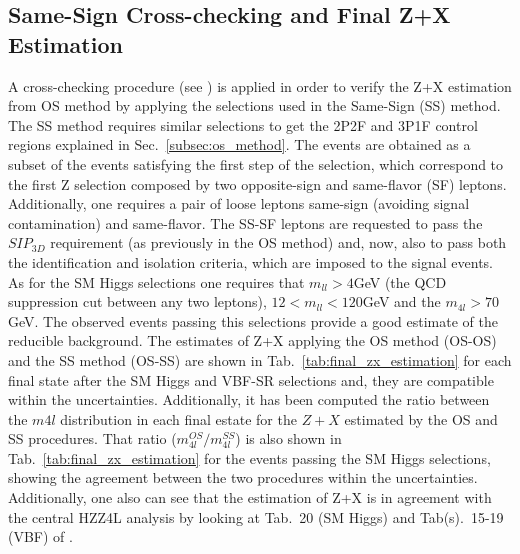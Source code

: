 \subsection{Same-Sign Cross-checking and Final Z+X Estimation}
A cross-checking procedure (see \cite{bib:CMS-HIG-13-002,bib:CMS-AN-16-328}) is applied in order to verify the Z+X estimation from OS method by applying the selections used in the Same-Sign (SS) method. The SS method requires similar selections to get the 2P2F and 3P1F control regions explained in Sec.~\ref{subsec:os_method}. The events are obtained as a subset of the events satisfying the first step of the selection, which correspond to the first Z selection composed by two opposite-sign and same-flavor (SF) leptons. Additionally, one requires a pair of loose leptons same-sign (avoiding signal contamination) and same-flavor. The SS-SF leptons are requested to pass the $SIP_{3D}$ requirement (as previously in the OS method) and, now, also to pass both the identification and isolation criteria, which are imposed to the signal events. As for the SM Higgs selections one requires that $m_{ll} > 4$GeV (the QCD suppression cut between any two leptons), $12 < m_{ll} < 120$GeV and the $m_{4l} > 70$GeV. The observed events passing this selections provide a good estimate of the reducible background. The estimates of Z+X applying the OS method (OS-OS) and the SS method (OS-SS) are shown in Tab.~\ref{tab:final_zx_estimation} for each final state after the SM Higgs and VBF-SR selections and, they are compatible within the uncertainties. Additionally, it has been computed the ratio between the $m4l$ distribution in each final estate for the $Z+X$ estimated by the OS and SS procedures. That ratio ($m_{4l}^{OS}/m_{4l}^{SS}$) is also shown in Tab.~\ref{tab:final_zx_estimation} for the events passing the SM Higgs selections, showing the agreement between the two procedures within the uncertainties. Additionally, one also can see that the estimation of Z+X is in agreement with the central HZZ4L analysis by looking at Tab.~20 (SM Higgs) and Tab(s).~15-19 (VBF) of \cite{bib:CMS-AN-16-442}.


